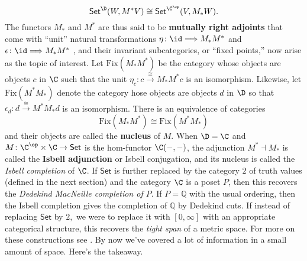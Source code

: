 \[\mathsf{Set}^\D(W,M^*V)\cong \mathsf{Set}^{\C^{\op}}(V,M_*W).\]
The functors $M_*$ and $M^*$ are thus said to be \textbf{mutually right adjoints} that come with ``unit'' natural transformations  $\eta\colon \id \Longrightarrow M_*M^*$ and $\epsilon \colon \id \Longrightarrow M_*M^*$ \cite[Definition 4.3.1]{riehl2017category}, and their invariant subcategories, or ``fixed points,'' now arise as the topic of interest. Let $\text{Fix}(M_*M^*)$ be the category whose objects are objects $c$ in $\C$ such that the unit $\eta_c\colon c \overset{\cong}{\longrightarrow} M_*M^*c$ is an isomorphism. Likewise, let $\text{Fix}(M^*M_*)$ denote the category hose objects are objects $d$ in $\D$ so that $\epsilon_d\colon d \overset{\cong}{\longrightarrow} M^*M_*d$ is an isomorphism. There is an equivalence of categories
\[
\text{Fix}(M_*M^*)\cong
\text{Fix}(M^*M_*)
\] 
and their objects are called the \textbf{nucleus} of $M$. When $\D=\C$ and $M\colon \C^{\op}\times \C\to\mathsf{Set}$ is the hom-functor $\C(-,-)$, the adjunction $M^*\dashv M_*$ is called the \textbf{Isbell adjunction} or Isbell conjugation, and its nucleus is called the \emph{Isbell completion} of $\C$. If $\mathsf{Set}$ is further replaced by the category $2$ of truth values (defined in the next section) and the category $\C$ is a poset $P$, then this recovers the \emph{Dedekind MacNeille completion of $P$}. If $P=\mathbb{Q}$ with the usual ordering, then the Isbell completion gives the completion of $\mathbb{Q}$ by Dedekind cuts. If instead of replacing $\mathsf{Set}$ by $2,$ we were to replace it with $[0,\infty]$ with an appropriate categorical structure, this recovers the \emph{tight span} of a metric space. For more on these constructions see \cite{willerton2015legendrefenchel,pavlovic2012quantitative,isbell1966structure,Lawvere86takingcategories,Elliott2017OnTF,willerton2013tight}. By now we've covered a lot of information in a small amount of space. Here's the takeaway.


